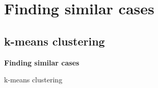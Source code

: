 \documentclass[compress]{beamer}
\begin{document}
%
%
%
%
%
%
%









\section{Finding similar cases}

\subsection{k-means clustering}

\begin{frame}[plain]
\textbf{Finding similar cases}

k-means clustering
\end{frame}
\end{document}
